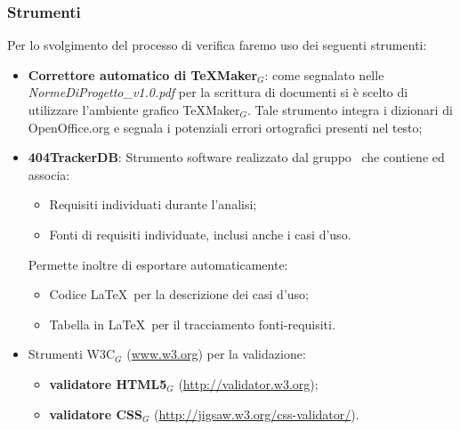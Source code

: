 \subsubsection{Strumenti}
Per lo svolgimento del processo di verifica faremo uso dei seguenti strumenti:
\begin{itemize}
	\item \textbf{Correttore automatico di TeXMaker$_G$}: come segnalato nelle \textit{NormeDiProgetto\_v1.0.pdf} per la scrittura di documenti si è scelto di utilizzare l'ambiente grafico TeXMaker$_G$. Tale strumento integra i dizionari di OpenOffice.org e segnala i potenziali
	errori ortografici presenti nel testo;
	
	\item \textbf{404TrackerDB}: Strumento software realizzato dal gruppo \gruppo\ che contiene ed associa:
	\begin{itemize}
		\item Requisiti individuati durante l'analisi;
		\item Fonti di requisiti individuate, inclusi anche i casi d'uso.
	\end{itemize}
	Permette inoltre di esportare automaticamente:
	\begin{itemize}
		\item Codice \LaTeX\ per la descrizione dei casi d'uso;
		\item Tabella in \LaTeX\ per il tracciamento fonti-requisiti.
	\end{itemize}

	\item Strumenti W3C$_G$ (\href{www.w3.org}{www.w3.org}) per la validazione:
	    \begin{itemize}
	    	\item \textbf{validatore HTML5$_G$} (\href{http://validator.w3.org}{http://validator.w3.org});
	    	\item \textbf{validatore CSS$_G$}
	    	(\href{http://jigsaw.w3.org/css-validator/}{http://jigsaw.w3.org/css-validator/}).
	    \end{itemize}
	

\end{itemize}
